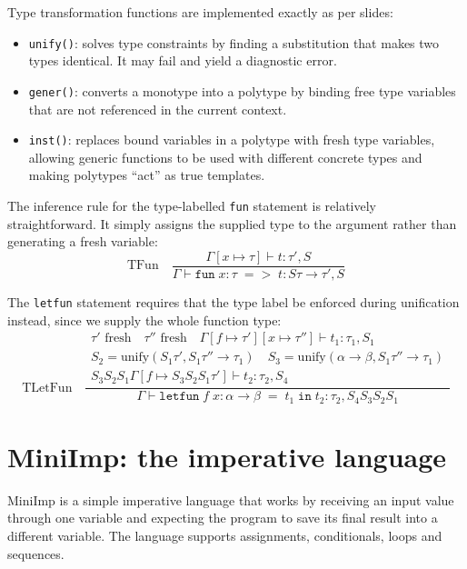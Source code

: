 \documentclass[12pt]{article}
\newcommand{\Code}[1]{\texttt{#1}}
\begin{document}
Type transformation functions are implemented exactly as per slides:
\begin{itemize}
    \item \Code{unify()}: solves type constraints by finding a substitution that
        makes two types identical. It may fail and yield a diagnostic error.
    \item \Code{gener()}: converts a monotype into a polytype by binding free
        type variables that are not referenced in the current context.
    \item \Code{inst()}: replaces bound variables in a polytype with fresh type
        variables, allowing generic functions to be used with different concrete
        types and making polytypes ``act'' as true templates.
\end{itemize}

The inference rule for the type-labelled \texttt{fun} statement is relatively
straightforward. It simply assigns the supplied type to the argument rather than
generating a fresh variable:
$$
\text{TFun}\quad
\frac
{ \Gamma [x \mapsto \tau] \vdash t : \tau',S }
{ \Gamma \vdash \texttt{fun} \; x : \tau \; => \; t : S\tau \rightarrow
  \tau',S }
$$

The \texttt{letfun} statement requires that the type label be enforced during
unification instead, since we supply the whole function type:
$$
\text{TLetFun}\quad
\frac
{
    \begin{array}{c}
        \tau' \text{ fresh} \quad
        \tau'' \text{ fresh} \quad
        \Gamma [f \mapsto \tau'] [x \mapsto \tau''] \vdash t_1 : \tau_1,S_1 \\
        S_2 = \text{unify}(S_1\tau', S_1\tau'' \rightarrow \tau_1) \quad
        S_3 = \text{unify}(\alpha \rightarrow \beta, S_1\tau'' \rightarrow
            \tau_1) \\
        S_3S_2S_1\Gamma [f \mapsto S_3S_2S_1\tau'] \vdash t_2 : \tau_2,S_4
    \end{array}
}
{ \Gamma \vdash \texttt{letfun} \; f \; x : \alpha \rightarrow \beta \; = \;
  t_1 \; \texttt{in} \; t_2 : \tau_2,S_4S_3S_2S_1 }
$$

\section{MiniImp: the imperative language}

MiniImp is a simple imperative language that works by receiving an input value
through one variable and expecting the program to save its final result into a
different variable. The language supports assignments, conditionals, loops and
sequences.
\end{document}
